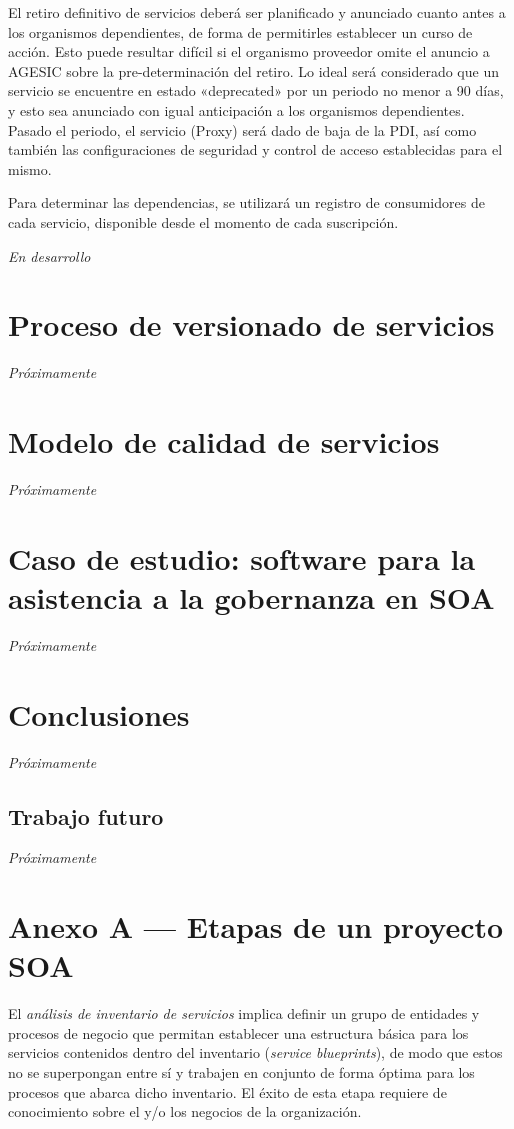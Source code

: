 \documentclass[11pt]{article}
\begin{document}
				El retiro definitivo de servicios deberá ser planificado y anunciado cuanto antes a los organismos dependientes, de forma de permitirles establecer un curso de acción. Esto puede resultar difícil si el organismo proveedor omite el anuncio a AGESIC sobre la pre-determinación del retiro. Lo ideal será considerado que un servicio se encuentre en estado «deprecated» por un periodo no menor a 90 días, y esto sea anunciado con igual anticipación a los organismos dependientes. Pasado el periodo, el servicio (Proxy) será dado de baja de la PDI, así como también las configuraciones de seguridad y control de acceso establecidas para el mismo.

				Para determinar las dependencias, se utilizará un registro de consumidores de cada servicio, disponible desde el momento de cada suscripción.

				\emph{En desarrollo}

	\section{Proceso de versionado de servicios}
		\label{sec:versionado}
		\emph{Próximamente}

	\section{Modelo de calidad de servicios}
		\label{sec:calidad}
		\emph{Próximamente}

	\section{Caso de estudio: software para la asistencia a la gobernanza en SOA}
		\label{sec:caso_estudio}
		\emph{Próximamente}

	\section{Conclusiones}
		\label{sec:conclusiones}
		\emph{Próximamente}
		\subsection{Trabajo futuro}
			\emph{Próximamente}

	\section{Anexo A — Etapas de un proyecto SOA}
		\label{sec:anexoA}
		El \emph{análisis de inventario de servicios} implica definir un grupo de entidades y procesos de negocio que permitan establecer una estructura básica para los servicios contenidos dentro del inventario (\emph{service blueprints}), de modo que estos no se superpongan entre sí y trabajen en conjunto de forma óptima para los procesos que abarca dicho inventario. El éxito de esta etapa requiere de conocimiento sobre el y/o los negocios de la organización.
\end{document}

